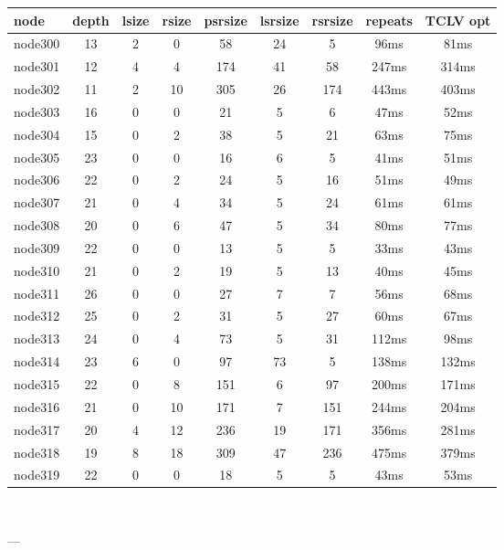 \begin{tabular}{|l|c|c|c|c|c|c|c|c|}
\hline node & depth & lsize & rsize & psrsize & lsrsize & rsrsize   & repeats & TCLV opt\\
    \hline node300 & 13 & 2 & 0 & 58 & 24 & 5 & 96ms & 81ms\\
    \hline node301 & 12 & 4 & 4 & 174 & 41 & 58 & 247ms & 314ms\\
    \hline node302 & 11 & 2 & 10 & 305 & 26 & 174 & 443ms & 403ms\\
    \hline node303 & 16 & 0 & 0 & 21 & 5 & 6 & 47ms & 52ms\\
    \hline node304 & 15 & 0 & 2 & 38 & 5 & 21 & 63ms & 75ms\\
    \hline node305 & 23 & 0 & 0 & 16 & 6 & 5 & 41ms & 51ms\\
    \hline node306 & 22 & 0 & 2 & 24 & 5 & 16 & 51ms & 49ms\\
    \hline node307 & 21 & 0 & 4 & 34 & 5 & 24 & 61ms & 61ms\\
    \hline node308 & 20 & 0 & 6 & 47 & 5 & 34 & 80ms & 77ms\\
    \hline node309 & 22 & 0 & 0 & 13 & 5 & 5 & 33ms & 43ms\\
    \hline node310 & 21 & 0 & 2 & 19 & 5 & 13 & 40ms & 45ms\\
    \hline node311 & 26 & 0 & 0 & 27 & 7 & 7 & 56ms & 68ms\\
    \hline node312 & 25 & 0 & 2 & 31 & 5 & 27 & 60ms & 67ms\\
    \hline node313 & 24 & 0 & 4 & 73 & 5 & 31 & 112ms & 98ms\\
    \hline node314 & 23 & 6 & 0 & 97 & 73 & 5 & 138ms & 132ms\\
    \hline node315 & 22 & 0 & 8 & 151 & 6 & 97 & 200ms & 171ms\\
    \hline node316 & 21 & 0 & 10 & 171 & 7 & 151 & 244ms & 204ms\\
    \hline node317 & 20 & 4 & 12 & 236 & 19 & 171 & 356ms & 281ms\\
    \hline node318 & 19 & 8 & 18 & 309 & 47 & 236 & 475ms & 379ms\\
    \hline node319 & 22 & 0 & 0 & 18 & 5 & 5 & 43ms & 53ms\\

\hline
\end{tabular} \

---


